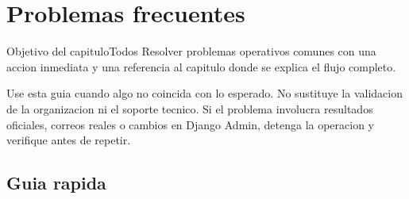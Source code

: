 \chapter{Problemas frecuentes}
\label{cap:problemas-frecuentes}

\begin{procedimiento}{Objetivo del capitulo}{Todos}
Resolver problemas operativos comunes con una accion inmediata y una referencia al capitulo donde se explica el flujo completo.
\end{procedimiento}

Use esta guia cuando algo no coincida con lo esperado. No sustituye la validacion de la organizacion ni el soporte tecnico. Si el problema involucra resultados oficiales, correos reales o cambios en Django Admin, detenga la operacion y verifique antes de repetir.

\section{Guia rapida}

